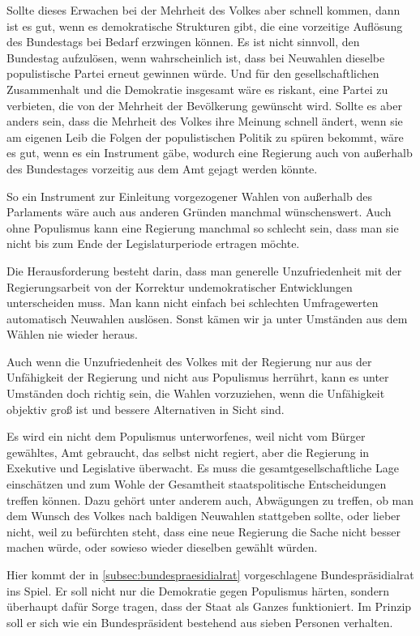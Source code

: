 Sollte dieses Erwachen bei der Mehrheit des Volkes aber schnell kommen, dann ist es gut, wenn es demokratische Strukturen gibt, die eine vorzeitige Auflösung des Bundestags bei Bedarf erzwingen können.
Es ist nicht sinnvoll, den Bundestag aufzulösen, wenn wahrscheinlich ist, dass bei Neuwahlen dieselbe populistische Partei erneut gewinnen würde.
Und für den gesellschaftlichen Zusammenhalt und die Demokratie insgesamt wäre es riskant, eine Partei zu verbieten, die von der Mehrheit der Bevölkerung gewünscht wird.
Sollte es aber anders sein, dass die Mehrheit des Volkes ihre Meinung schnell ändert, wenn sie am eigenen Leib die Folgen der populistischen Politik zu spüren bekommt, wäre es gut, wenn es ein Instrument gäbe, wodurch eine Regierung auch von außerhalb des Bundestages vorzeitig aus dem Amt gejagt werden könnte.

So ein Instrument zur Einleitung vorgezogener Wahlen von außerhalb des Parlaments wäre auch aus anderen Gründen manchmal wünschenswert.
Auch ohne Populismus kann eine Regierung manchmal so schlecht sein, dass man sie nicht bis zum Ende der Legislaturperiode ertragen möchte.

Die Herausforderung besteht darin, dass man generelle Unzufriedenheit mit der Regierungsarbeit von der Korrektur undemokratischer Entwicklungen unterscheiden muss.
Man kann nicht einfach bei schlechten Umfragewerten automatisch Neuwahlen auslösen.
Sonst kämen wir ja unter Umständen aus dem Wählen nie wieder heraus.

Auch wenn die Unzufriedenheit des Volkes mit der Regierung nur aus der Unfähigkeit der Regierung und nicht aus Populismus herrührt, kann es unter Umständen doch richtig sein,
die Wahlen vorzuziehen, wenn die Unfähigkeit objektiv groß ist und bessere Alternativen in Sicht sind.

Es wird ein nicht dem Populismus unterworfenes, weil nicht vom Bürger gewähltes, Amt gebraucht, das selbst nicht regiert, aber die Regierung in Exekutive und Legislative überwacht.
Es muss die gesamtgesellschaftliche Lage einschätzen und zum Wohle der Gesamtheit staatspolitische Entscheidungen treffen können.
Dazu gehört unter anderem auch, Abwägungen zu treffen, ob man dem Wunsch des Volkes nach baldigen Neuwahlen stattgeben sollte, oder lieber nicht, weil zu befürchten steht,
dass eine neue Regierung die Sache nicht besser machen würde, oder sowieso wieder dieselben gewählt würden.

Hier kommt der in \cref{subsec:bundespraesidialrat} vorgeschlagene Bundespräsidialrat ins Spiel.
Er soll nicht nur die Demokratie gegen Populismus härten, sondern überhaupt dafür Sorge tragen, dass der Staat als Ganzes funktioniert.
Im Prinzip soll er sich wie ein Bundespräsident bestehend aus sieben Personen verhalten.

